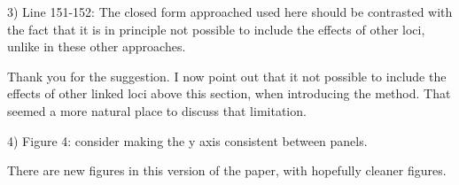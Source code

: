\documentclass{article}
\newenvironment{response}%
  {\list{}{\leftmargin=0.5in\rightmargin=0.5in\color{blue}}\item[]}%
  {\endlist}
\begin{document}
3) Line 151-152: The closed form approached used here should be contrasted with
the fact that it is in principle not possible to include the effects of other
loci, unlike in these other approaches.

\begin{response}
    Thank you for the suggestion. I now point out that it not possible to include
    the effects of other linked loci above this section, when introducing the
    method. That seemed a more natural place to discuss that limitation.
\end{response}

4) Figure 4: consider making the y axis consistent between panels.

\begin{response}
    There are new figures in this version of the paper, with hopefully cleaner figures.
\end{response}
\end{document}
